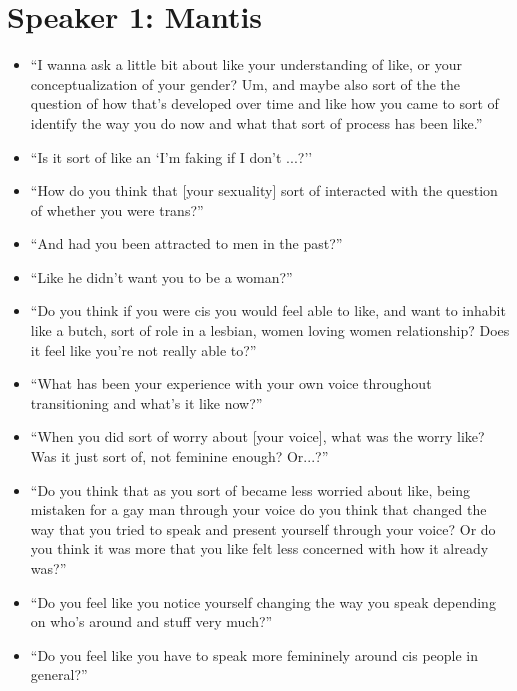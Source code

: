 \documentclass[12pt,twoside]{reedthesis}
\begin{document}
\section{Speaker 1: Mantis}
\begin{itemize}
 \item ``I wanna ask a little bit about like your understanding of like, or your conceptualization of your gender? Um, and maybe also sort of the the question of how that's developed over time and like how you came to sort of identify the way you do now and what that sort of process has been like.''
 \item ``Is it sort of like an `I'm faking if I don't ...?''
 \item ``How do you think that [your sexuality] sort of interacted with the question of whether you were trans?''
 \item ``And had you been attracted to men in the past?''
 \item ``Like he didn't want you to be a woman?''
 \item ``Do you think if you were cis you would feel able to like, and want to inhabit like a butch, sort of role in a lesbian, women loving women relationship? Does it feel like you're not really able to?''
 \item ``What has been your experience with your own voice throughout transitioning and what's it like now?''
 \item ``When you did sort of worry about [your voice], what was the worry like? Was it just sort of, not feminine enough? Or...?''
 \item ``Do you think that as you sort of became less worried about like, being mistaken for a gay man through your voice do you think that changed the way that you tried to speak and present yourself through your voice? Or do you think it was more that you like felt less concerned with how it already was?''
 \item ``Do you feel like you notice yourself changing the way you speak depending on who's around and stuff very much?''
 \item ``Do you feel like you have to speak more femininely around cis people in general?''
\end{itemize}
\end{document}
